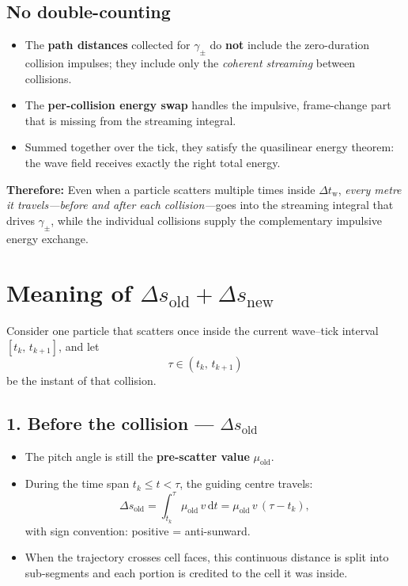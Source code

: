 {\subsection*{No double-counting}

\begin{itemize}
  \item The \textbf{path distances} collected for $\gamma_\pm$ do \textbf{not} include the zero-duration collision impulses; they include only the \emph{coherent streaming} between collisions.
  \item The \textbf{per-collision energy swap} handles the impulsive, frame-change part that is missing from the streaming integral.
  \item Summed together over the tick, they satisfy the quasilinear energy theorem: the wave field receives exactly the right total energy.
\end{itemize}

\bigskip

\noindent\textbf{Therefore:} Even when a particle scatters multiple times inside $\Delta t_{\mathrm w}$, \emph{every metre it travels—before and after each collision—}goes into the streaming integral that drives $\gamma_\pm$, while the individual collisions supply the complementary impulsive energy exchange.


\section*{Meaning of $\Delta s_{\text{old}} + \Delta s_{\text{new}}$}

Consider one particle that scatters once inside the current wave–tick interval $[t_k,\,t_{k+1}]$, and let
\[
\tau \in (t_k,\,t_{k+1})
\]
be the instant of that collision.

\subsection*{1. Before the collision — $\Delta s_{\text{old}}$}

\begin{itemize}
  \item The pitch angle is still the \textbf{pre-scatter value} $\mu_{\text{old}}$.
  \item During the time span $t_k \leq t < \tau$, the guiding centre travels:
  \[
  \Delta s_{\text{old}} = \int_{t_k}^{\tau} \mu_{\text{old}}\,v \,\mathrm{d}t
  = \mu_{\text{old}}\,v\,(\tau - t_k),
  \]
  with sign convention: positive = anti-sunward.
  \item When the trajectory crosses cell faces, this continuous distance is split into sub-segments and each portion is credited to the cell it was inside.
\end{itemize}

}
